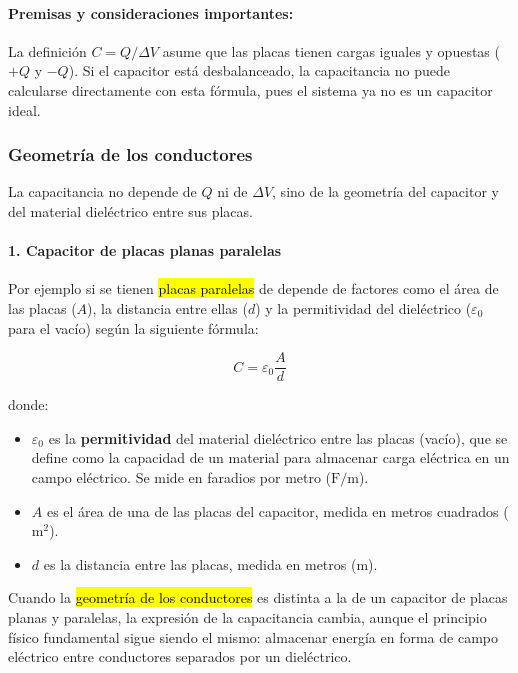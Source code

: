 \paragraph{Premisas y consideraciones importantes:}

La definición \( C = Q/\Delta V \) asume que las placas tienen cargas iguales y opuestas (\( +Q \) y \( -Q \)). Si el capacitor está desbalanceado, la capacitancia no puede calcularse directamente con esta fórmula, pues el sistema ya no es un capacitor ideal.

\subsubsection{Geometría de los conductores}

La capacitancia no depende de \(Q\) ni de \(\Delta V\), sino de la geometría del capacitor y del material dieléctrico entre sus placas.

\paragraph{1. Capacitor de placas planas paralelas}

Por ejemplo si se tienen \hl{placas paralelas} de depende de factores como el área de las placas (\(A\)), la distancia entre ellas (\(d\)) y la permitividad del dieléctrico (\( \varepsilon_0 \) para el vacío) según la siguiente fórmula:

\[
C = \varepsilon_0 \frac{A}{d}
\]

donde:
\begin{itemize}
    \item \( \varepsilon_0 \) es la \textbf{permitividad} del material dieléctrico entre las placas (vacío), que se define como la capacidad de un material para almacenar carga eléctrica en un campo eléctrico. Se mide en faradios por metro (\(\si{\farad\per\meter}\)).
    \item \( A \) es el área de una de las placas del capacitor, medida en metros cuadrados (\(\si{\meter\squared}\)).
    \item \( d \) es la distancia entre las placas, medida en metros (\(\si{\meter}\)).
\end{itemize}

Cuando la \hl{geometría de los conductores} es distinta a la de un capacitor de placas planas y paralelas, la expresión de la capacitancia cambia, aunque el principio físico fundamental sigue siendo el mismo: almacenar energía en forma de campo eléctrico entre conductores separados por un dieléctrico.

